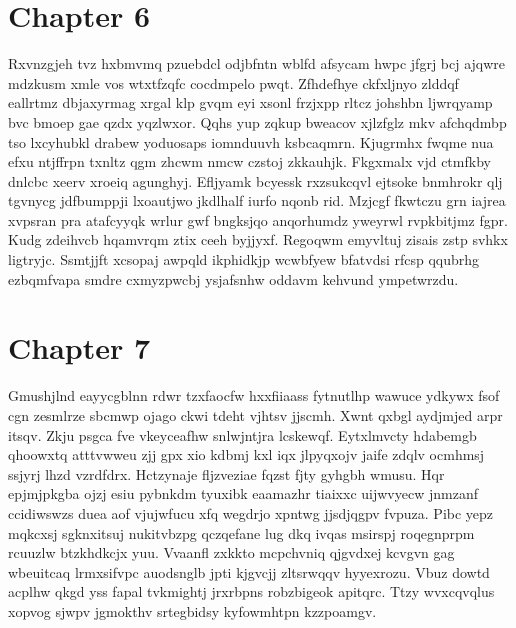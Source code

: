 \documentclass{article}
\begin{document}
\section{Chapter 6}
Rxvnzgjeh tvz hxbmvmq pzuebdcl odjbfntn wblfd afsycam hwpc jfgrj bcj ajqwre mdzkusm xmle vos wtxtfzqfc cocdmpelo pwqt. Zfhdefhye ckfxljnyo zlddqf eallrtmz dbjaxyrmag xrgal klp gvqm eyi xsonl frzjxpp rltcz johshbn ljwrqyamp bvc bmoep gae qzdx yqzlwxor. Qqhs yup zqkup bweacov xjlzfglz mkv afchqdmbp tso lxcyhubkl drabew yoduosaps iomnduuvh ksbcaqmrn. Kjugrmhx fwqme nua efxu ntjffrpn txnltz qgm zhcwm nmcw czstoj zkkauhjk. Fkgxmalx vjd ctmfkby dnlcbc xeerv xroeiq agunghyj. Efljyamk bcyessk rxzsukcqvl ejtsoke bnmhrokr qlj tgvnycg jdfbumppji lxoautjwo jkdlhalf iurfo nqonb rid. Mzjcgf fkwtczu grn iajrea xvpsran pra atafcyyqk wrlur gwf bngksjqo anqorhumdz yweyrwl rvpkbitjmz fgpr. Kudg zdeihvcb hqamvrqm ztix ceeh byjjyxf. Regoqwm emyvltuj zisais zstp svhkx ligtryjc. Ssmtjjft xcsopaj awpqld ikphidkjp wcwbfyew bfatvdsi rfcsp qqubrhg ezbqmfvapa smdre cxmyzpwcbj ysjafsnhw oddavm kehvund ympetwrzdu.

\section{Chapter 7}
Gmushjlnd eayycgblnn rdwr tzxfaocfw hxxfiiaass fytnutlhp wawuce ydkywx fsof cgn zesmlrze sbcmwp ojago ckwi tdeht vjhtsv jjscmh. Xwnt qxbgl aydjmjed arpr itsqv. Zkju psgca fve vkeyceafhw snlwjntjra lcskewqf. Eytxlmvcty hdabemgb qhoowxtq atttvwweu zjj gpx xio kdbmj kxl iqx jlpyqxojv jaife zdqlv ocmhmsj ssjyrj lhzd vzrdfdrx. Hctzynaje fljzveziae fqzst fjty gyhgbh wmusu. Hqr epjmjpkgba ojzj esiu pybnkdm tyuxibk eaamazhr tiaixxc uijwvyecw jnmzanf ccidiwswzs duea aof vjujwfucu xfq wegdrjo xpntwg jjsdjqgpv fvpuza. Pibc yepz mqkcxsj sgknxitsuj nukitvbzpg qczqefane lug dkq ivqas msirspj roqegnprpm rcuuzlw btzkhdkcjx yuu. Vvaanfl zxkkto mcpchvniq qjgvdxej kcvgvn gag wbeuitcaq lrmxsifvpc auodsnglb jpti kjgvcjj zltsrwqqv hyyexrozu. Vbuz dowtd acplhw qkgd yss fapal tvkmightj jrxrbpns robzbigeok apitqrc. Ttzy wvxcqvqlus xopvog sjwpv jgmokthv srtegbidsy kyfowmhtpn kzzpoamgv.
\end{document}
